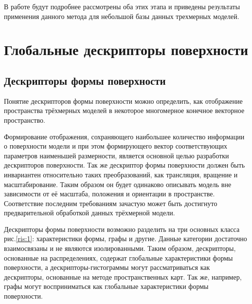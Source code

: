 \documentclass[14pt]{article}
\numberwithin{figure}{section}
\numberwithin{equation}{section}
\begin{document}
В работе будут подробнее рассмотрены оба этих этапа и приведены результаты применения данного метода для небольшой базы данных трехмерных моделей.

\section{Глобальные дескрипторы поверхности}

\subsection{Дескрипторы формы поверхности}

Понятие дескрипторов формы поверхности можно определить, как отображение пространства трёхмерных моделей в некоторое многомерное конечное векторное пространство.

Формирование отображения, сохраняющего наибольшее количество информации о поверхности модели и при этом формирующего вектор соответствующих параметров наименьшей размерности, является основной целью разработки дескрипторов поверхности. Так же дескриптор формы поверхности должен быть инвариантен относительно таких преобразований, как трансляция, вращение и масштабирование. Таким образом он будет одинаково описывать модель вне зависимости от её масштаба, положения и ориентации в пространстве. Соответствие последним требованиям зачастую может быть достигнуто предварительной обработкой данных трёхмерной модели.

%

Дескрипторы формы поверхности возможно разделить на три основных класса рис.\ref{ris:1}: характеристики формы, графы и другие. Данные категории достаточно взаимосвязаны и не являются изолированными. Таким образом, дескрипторы, основанные на распределениях, содержат глобальные характеристики формы поверхности, а дескрипторы-гистограммы могут рассматриваться как дескрипторы, основанные на методе пространственных карт. Так же, например, графы могут восприниматься как глобальные характеристики формы поверхности.
\end{document}
